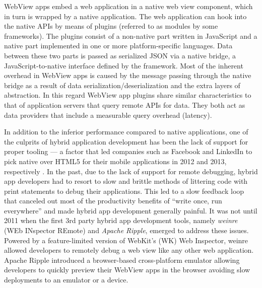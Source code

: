 \documentclass[thesis.tex]{subfiles}
\begin{document}
WebView apps embed a web application in a native web view component, which in turn is wrapped by a native application. The web application can hook into the native APIs by means of plugins (referred to as modules by some frameworks). The plugins consist of a non-native part written in JavaScript and a native part implemented in one or more platform-specific languages. Data between these two parts is passed as serialized JSON via a native bridge, a JavaScript-to-native interface defined by the framework. Most of the inherent overhead in WebView apps is caused by the message passing through the native bridge as a result of data serialization/deserialization and the extra layers of abstraction. In this regard WebView app plugins share similar characteristics to that of application servers that query remote APIs for data. They both act as data providers that include a measurable query overhead (latency).

In addition to the inferior performance compared to native applications, one of the culprits of hybrid application development has been the lack of support for proper tooling --- a factor that led companies such as Facebook and LinkedIn to pick native over HTML5 for their mobile applications in 2012 and 2013, respectively \cite{html_vs_native_facebook}\cite{html_vs_native_linkedin}. In the past, due to the lack of support for remote debugging, hybrid app developers had to resort to slow and brittle methods of littering code with print statements to debug their applications. This led to a slow feedback loop that canceled out most of the productivity benefits of ``write once, run everywhere'' and made hybrid app development generally painful. It was not until 2011 when the first 3rd party hybrid app development tools, namely \textit{weinre} (WEb INspector REmote) and \textit{Apache Ripple}, emerged to address these issues. Powered by a feature-limited version of WebKit's (WK) Web Inspector, weinre allowed developers to remotely debug a web view like any other web application. Apache Ripple introduced a browser-based cross-platform emulator allowing developers to quickly preview their WebView apps in the browser avoiding slow deployments to an emulator or a device.
\end{document}
